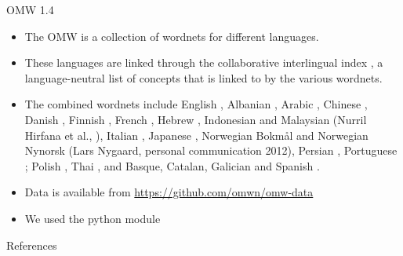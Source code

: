 \documentclass[dvipsnames]{beamer}
\begin{document}
\begin{frame}{OMW 1.4}
  \begin{itemize}
  \item The OMW is a collection of wordnets for different languages.
  \item These languages are linked through the collaborative interlingual index \citep[CILI;][]{Bond:Vossen:McCrae:Fellbaum:2016}, a language-neutral list of concepts that is linked to by the various wordnets.
    
  \item The combined wordnets include 
English \citep{_Fellbaum:1998}, 
Albanian \citep{Ruci:2008}, 
Arabic \citep{Black:Elkateb:Rodriguez:Alkhalifa:Vossen:Pease:Bertran:Fellbaum:2006}, 
Chinese \citep{Huang:Hsieh:Hong:Chen:Su:Chen:Huang:2010}, 
Danish \citep{Pedersen:2009}, 
Finnish \citep{Linden:Carlson:2010}, 
French \citep{Sagot:Fiser:2008}, 
Hebrew \citep{Ordan:Wintner:2007},
Indonesian and Malaysian (Nurril Hirfana et al., \citeyear{Noor:Sapuan:Bond:2011}), 
Italian \citep{Pianta:Bentivogli:Girardi:2002,Toral:Bracale:Monachini:Soria:2010}, 
Japanese \citep{Isahara:Bond:Uchimoto:Utiyama:Kanzaki:2008}, 
Norwegian Bokm\r{a}l and Norwegian Nynorsk (Lars Nygaard, personal communication 2012),
Persian \citep{Montazery:Faili:2010}, 
Portuguese \citep{Paiva:Rademaker:2012};
Polish \citep{Piasecki:Szpakowicz:Broda:2009}, 
Thai \citep{Thoongsup:Charoenporn:Robkop:Sinthurahat:Mokarat:Sornlertlamvanich:Isahara:2009},
and Basque, Catalan, Galician and Spanish \citep{Gonzalez-Agirre:Laparra:Rigau:2012}.
\item Data is available from \url{https://github.com/omwn/omw-data}
\item We used the python  module \citep{Goodman:Bond:2021}
\end{itemize}
\end{frame}


\begin{frame}[allowframebreaks]{References}
  
  
\end{frame}
\end{document}
